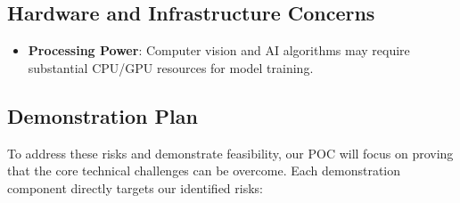 \documentclass{article}
\begin{document}
\subsection{Hardware and Infrastructure Concerns}

\begin{itemize}
\item \textbf{Processing Power}: Computer vision and AI algorithms may require substantial CPU/GPU resources for model training.
\end{itemize}

\subsection{Demonstration Plan}

To address these risks and demonstrate feasibility, our POC will focus on proving that the core technical challenges can be overcome. Each demonstration component directly targets our identified risks:
\end{document}
